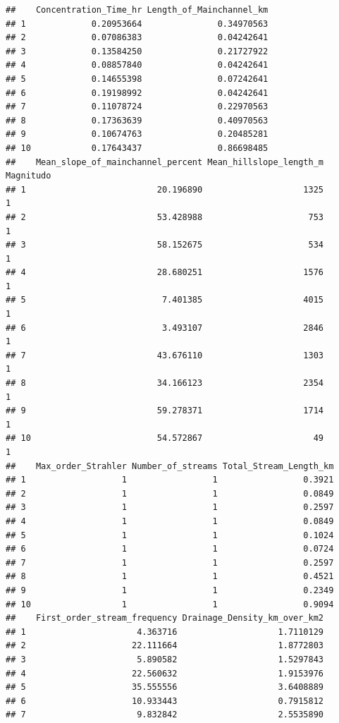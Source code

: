 \documentclass[11pt,]{article}
\begin{document}
\begin{verbatim}
##    Concentration_Time_hr Length_of_Mainchannel_km
## 1             0.20953664               0.34970563
## 2             0.07086383               0.04242641
## 3             0.13584250               0.21727922
## 4             0.08857840               0.04242641
## 5             0.14655398               0.07242641
## 6             0.19198992               0.04242641
## 7             0.11078724               0.22970563
## 8             0.17363639               0.40970563
## 9             0.10674763               0.20485281
## 10            0.17643437               0.86698485
##    Mean_slope_of_mainchannel_percent Mean_hillslope_length_m Magnitudo
## 1                          20.196890                    1325         1
## 2                          53.428988                     753         1
## 3                          58.152675                     534         1
## 4                          28.680251                    1576         1
## 5                           7.401385                    4015         1
## 6                           3.493107                    2846         1
## 7                          43.676110                    1303         1
## 8                          34.166123                    2354         1
## 9                          59.278371                    1714         1
## 10                         54.572867                      49         1
##    Max_order_Strahler Number_of_streams Total_Stream_Length_km
## 1                   1                 1                 0.3921
## 2                   1                 1                 0.0849
## 3                   1                 1                 0.2597
## 4                   1                 1                 0.0849
## 5                   1                 1                 0.1024
## 6                   1                 1                 0.0724
## 7                   1                 1                 0.2597
## 8                   1                 1                 0.4521
## 9                   1                 1                 0.2349
## 10                  1                 1                 0.9094
##    First_order_stream_frequency Drainage_Density_km_over_km2
## 1                      4.363716                    1.7110129
## 2                     22.111664                    1.8772803
## 3                      5.890582                    1.5297843
## 4                     22.560632                    1.9153976
## 5                     35.555556                    3.6408889
## 6                     10.933443                    0.7915812
## 7                      9.832842                    2.5535890

\end{verbatim}
\end{document}
